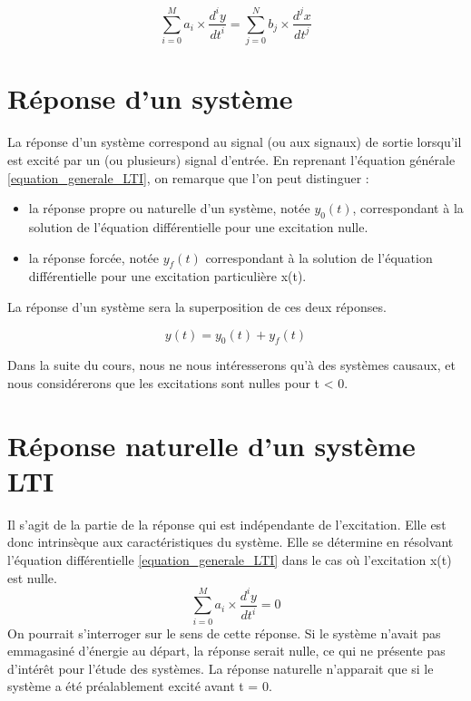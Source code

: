 	\begin{equation}\label{equation_generale_LTI}
	\sum_{i=0}^M a_{i}\times \frac{d^{i}y}{dt^{i}} = \sum_{j=0}^N b_{j}\times \frac{d^{j}x}{dt^{j}}
	\end{equation}
	
	
	\section{Réponse d'un système}
	La réponse d'un système correspond au signal (ou aux signaux) de sortie lorsqu'il est excité par un (ou plusieurs) signal d'entrée. En reprenant l'équation générale \ref{equation_generale_LTI}, on remarque que l'on peut distinguer :
	\begin{itemize}
		\item la réponse propre ou naturelle d'un système, notée $y_{0}(t)$, correspondant à la solution de l'équation différentielle pour une excitation nulle.
		\item la réponse forcée, notée $y_{f}(t)$ correspondant à la solution de l'équation différentielle pour une excitation particulière x(t).
	\end{itemize}
	
	La réponse d'un système sera la superposition de ces deux réponses.
	
	\begin{equation}
	y(t) = y_{0}(t)+y_{f}(t)
	\end{equation}
	
	Dans la suite du cours, nous ne nous intéresserons qu'à des systèmes causaux,  et nous considérerons que les excitations sont nulles pour t < 0.
	
	\section{Réponse naturelle d'un système LTI}
	Il s'agit de la partie de la réponse qui est indépendante de l'excitation. Elle est donc intrinsèque aux caractéristiques du système. Elle se détermine en résolvant l'équation différentielle \ref{equation_generale_LTI} dans le cas où l'excitation x(t) est nulle.
	\begin{equation}\label{equa_diff_reponse_naturelle}
	\sum_{i=0}^M a_{i}\times \frac{d^{i}y}{dt^{i}} = 0
	\end{equation}
	On pourrait s'interroger sur le sens de cette réponse. Si le système n'avait pas emmagasiné d'énergie au départ, la réponse serait nulle, ce qui ne présente pas d'intérêt pour l'étude des systèmes. La réponse naturelle n'apparait que si le système a été préalablement excité avant t = 0.  
	
